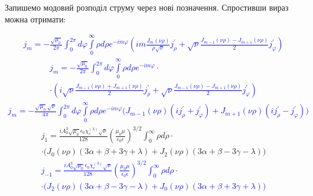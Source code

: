 Запишемо модовий розподіл струму через нові позначення. Спростивши вираз 
можна отримати:

\textcolor{blue} { \begin{equation*} \begin{aligned}
j_m = - \frac{\sqrt{\mu_0}}{2\pi} 
\int_0^{2\pi} d \varphi \int \limits_0^\infty \rho d \rho
e^{-im\varphi} \left( i m \frac{J_m (\nu \rho)}{\rho \sqrt{\nu}}
j_\rho^\prime + \sqrt{\nu}
\frac{J_{m-1} (\nu \rho) - J_{m+1} (\nu \rho)}{2}
j_\varphi^\prime \right)
\end{aligned} \end{equation*} }
%
\textcolor{blue} { \begin{equation*} \begin{aligned}
j_m = - \frac{\sqrt{\mu_0}}{2\pi} 
\int_0^{2\pi} d \varphi \int \limits_0^\infty \rho d \rho 
e^{-im\varphi} \cdot \\ \cdot 
\left( i \sqrt{\nu} \frac{J_{m-1} (\nu \rho) + J_{m+1} (\nu \rho)}{2}
j_\rho^\prime + \sqrt{\nu} 
\frac{J_{m-1} (\nu \rho) - J_{m+1} (\nu \rho)}{2}
j_\varphi^\prime \right)
\end{aligned} \end{equation*} }
%
\textcolor{blue} { \begin{equation*} \begin{aligned}
j_m = - \frac{\sqrt{\mu_0} \sqrt{\nu}}{4\pi} 
\int_0^{2\pi} d \varphi \int \limits_0^\infty \rho d \rho 
e^{-im\varphi} \Big(
J_{m-1} (\nu \rho) ( i j_\rho^\prime + j_\varphi^\prime ) +
J_{m+1} (\nu \rho) ( i j_\rho^\prime - j_\varphi^\prime ) \Big)
\end{aligned} \end{equation*} }
%
\begin{equation} \begin{aligned}
j_1 = \frac{i A_0^3 \sqrt{\mu_0} \epsilon_0 \chi_e^{(3)} \sqrt{\nu}}{128}
\left( \frac{\mu_0 \mu}{\epsilon_0 \epsilon} \right)^{3/2}
\int_0^\infty \rho d \rho \cdot \\ \cdot
\Big( J_0 (\nu \rho) ( 3 \alpha + \beta + 3 \gamma + \lambda) + 
J_2 (\nu \rho) ( 3 \alpha + \beta - 3 \gamma - \lambda ) \Big)
\end{aligned} \end{equation}
%
\textcolor{blue} { \begin{equation*} \begin{aligned}
j_{-1} = \frac{i A_0^3 \sqrt{\mu_0} \epsilon_0 \chi_e^{(3)} \sqrt{\nu}}{128}
\left( \frac{\mu_0 \mu}{\epsilon_0 \epsilon} \right)^{3/2}
\int_0^\infty \rho d \rho \cdot \\ \cdot
\Big( J_2 (\nu \rho) ( 3 \alpha + \beta - 3 \gamma - \lambda ) + 
J_0 (\nu \rho) ( 3 \alpha + \beta + 3 \gamma + \lambda ) \Big)
\end{aligned} \end{equation*} }
